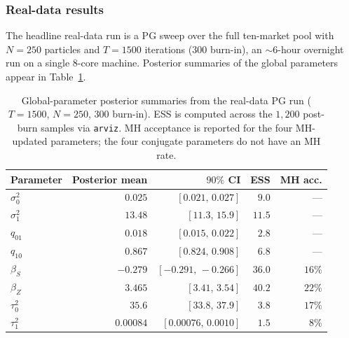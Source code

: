 \subsubsection{Real-data results}\label{ssec:realdata}

The headline real-data run is a PG sweep over the full ten-market pool with $N = 250$ particles and $T = 1500$ iterations ($300$ burn-in), an $\sim\!6$-hour overnight run on a single 8-core machine. Posterior summaries of the global parameters appear in Table~\ref{tab:phi}.

\begin{table}[t]
\centering\small
\begin{tabular}{lrrrr}
\toprule
Parameter & Posterior mean & $90\%$ CI & ESS & MH acc.\\
\midrule
$\sigma^2_0$ & $0.025$ & $[0.021,\, 0.027]$ & $9.0$ & --- \\
$\sigma^2_1$ & $13.48$ & $[11.3,\, 15.9]$ & $11.5$ & --- \\
$q_{01}$ & $0.018$ & $[0.015,\, 0.022]$ & $2.8$ & --- \\
$q_{10}$ & $0.867$ & $[0.824,\, 0.908]$ & $6.8$ & --- \\
$\beta_S$ & $-0.279$ & $[-0.291,\, -0.266]$ & $36.0$ & $16\%$ \\
$\beta_Z$ & $3.465$ & $[3.41,\, 3.54]$ & $40.2$ & $22\%$ \\
$\tau^2_0$ & $35.6$ & $[33.8,\, 37.9]$ & $3.8$ & $17\%$ \\
$\tau^2_1$ & $0.00084$ & $[0.00076,\, 0.0010]$ & $1.5$ & $8\%$ \\
\bottomrule
\end{tabular}
\caption{Global-parameter posterior summaries from the real-data PG run ($T = 1500$, $N = 250$, $300$ burn-in). ESS is computed across the $1{,}200$ post-burn samples via \texttt{arviz}. MH acceptance is reported for the four MH-updated parameters; the four conjugate parameters do not have an MH rate.}
\label{tab:phi}
\end{table}


